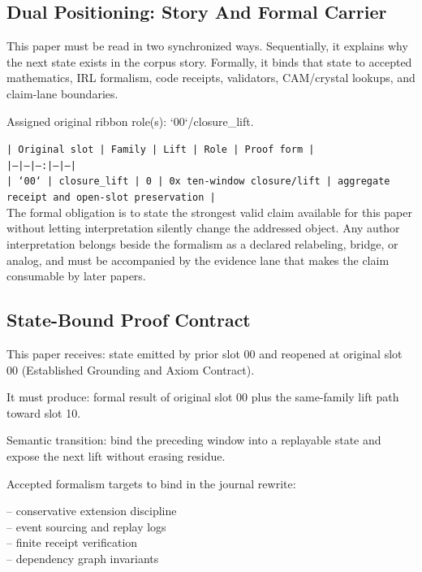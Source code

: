 \documentclass[11pt]{article}
\begin{document}
\subsection*{Dual Positioning: Story And Formal Carrier}

This paper must be read in two synchronized ways. Sequentially, it explains why
the next state exists in the corpus story. Formally, it binds that state to
accepted mathematics, IRL formalism, code receipts, validators, CAM/crystal
lookups, and claim-lane boundaries.

Assigned original ribbon role(s): `00`/closure\_lift.

\noindent\texttt{| Original slot | Family | Lift | Role | Proof form |}\\
\noindent\texttt{|---|---|---:|---|---|}\\
\noindent\texttt{| `00` | closure\_lift | 0 | 0x ten-window closure/lift | aggregate receipt and open-slot preservation |}\\

The formal obligation is to state the strongest valid claim available for this
paper without letting interpretation silently change the addressed object. Any
author interpretation belongs beside the formalism as a declared relabeling,
bridge, or analog, and must be accompanied by the evidence lane that makes the
claim consumable by later papers.

\subsection*{State-Bound Proof Contract}

This paper receives: state emitted by prior slot 00 and reopened at original slot 00 (Established Grounding and Axiom Contract).

It must produce: formal result of original slot 00 plus the same-family lift path toward slot 10.

Semantic transition: bind the preceding window into a replayable state and expose the next lift without erasing residue.

Accepted formalism targets to bind in the journal rewrite:

\noindent{}-- conservative extension discipline\\
\noindent{}-- event sourcing and replay logs\\
\noindent{}-- finite receipt verification\\
\noindent{}-- dependency graph invariants\\
\end{document}
